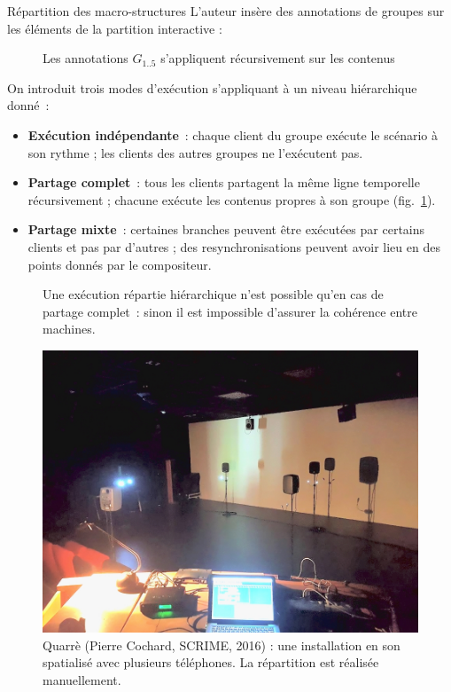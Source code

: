 \begin{block}{Répartition des macro-structures}
    L'auteur insère des annotations de groupes sur les éléments de la partition interactive : 
    
    \begin{figure}
        \begin{tikzpicture}[scale=4]
        
        \end{tikzpicture}
        \caption{Les annotations $G_{1..5}$ s'appliquent récursivement sur les contenus}
    \end{figure}

    On introduit trois modes d'exécution s'appliquant à un niveau hiérarchique donné~:
	\begin{itemize}
		\item \textbf{Exécution indépendante}~: chaque client du groupe exécute le scénario à son rythme ; les clients des autres groupes ne l'exécutent pas.
		\item \textbf{Partage complet}~: tous les clients partagent la même ligne temporelle récursivement ; chacune exécute les contenus propres à son groupe (fig.~\ref{fig.reparti}).
		\item \textbf{Partage mixte}~: certaines branches peuvent être exécutées par certains clients et pas par d'autres ; des resynchronisations peuvent avoir lieu en des points donnés par le compositeur.
	\end{itemize}
    
    \begin{figure} 
        \centering
        \begin{tikzpicture}[scale=4]
            
        \end{tikzpicture}
        \caption{Une exécution répartie hiérarchique n'est possible qu'en cas de partage complet~: sinon il est impossible d'assurer la cohérence entre machines.}
        \label{fig.reparti}
    \end{figure}
    
    \begin{figure}
        \includegraphics[scale=0.5]{images/quarre.jpg}
        \caption{Quarrè (Pierre Cochard, SCRIME, 2016) : une installation en son spatialisé avec plusieurs téléphones. La répartition est réalisée manuellement.}
    \end{figure}
\end{block}